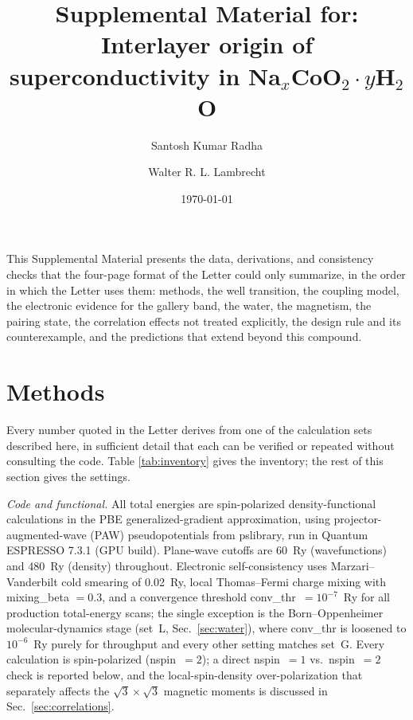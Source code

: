 \documentclass[aps,10pt,preprint,superscriptaddress,floatfix]{revtex4-2}
\begin{document}
\title{Supplemental Material for: Interlayer origin of superconductivity in Na$_x$CoO$_2\cdot y$H$_2$O}

\author{Santosh Kumar Radha}

\author{Walter R. L. Lambrecht}

\date{\today}

\maketitle

This Supplemental Material presents the data, derivations, and consistency checks that the
four-page format of the Letter could only summarize, in the order in which the Letter uses them:
methods, the well transition, the coupling model, the electronic evidence for the gallery band,
the water, the magnetism, the pairing state, the correlation effects not treated explicitly, the
design rule and its counterexample, and the predictions that extend beyond this compound.

\FloatBarrier
\section{Methods}
\label{sec:methods}

Every number quoted in the Letter derives from one of the calculation sets described here, in
sufficient detail that each can be verified or repeated without consulting the code. Table
\ref{tab:inventory} gives the inventory; the rest of this section gives the settings.

\emph{Code and functional.} All total energies are spin-polarized density-functional calculations
in the PBE generalized-gradient approximation, using projector-augmented-wave (PAW)
pseudopotentials from pslibrary, run in Quantum ESPRESSO 7.3.1 (GPU build). Plane-wave cutoffs are
60~Ry (wavefunctions) and 480~Ry (density) throughout. Electronic self-consistency uses
Marzari--Vanderbilt cold smearing of 0.02~Ry, local Thomas--Fermi charge mixing with mixing\_beta
$=0.3$, and a convergence threshold conv\_thr~$=10^{-7}$~Ry for all production total-energy scans;
the single exception is the Born--Oppenheimer molecular-dynamics stage (set~L,
Sec.~\ref{sec:water}), where conv\_thr is loosened to $10^{-6}$~Ry purely for throughput and every
other setting matches set~G. Every calculation is spin-polarized (nspin~$=2$); a direct
nspin~$=1$ vs.\ nspin~$=2$ check is reported below, and the local-spin-density over-polarization
that separately affects the $\sqrt3\times\sqrt3$ magnetic moments is discussed in
Sec.~\ref{sec:correlations}.
\end{document}
